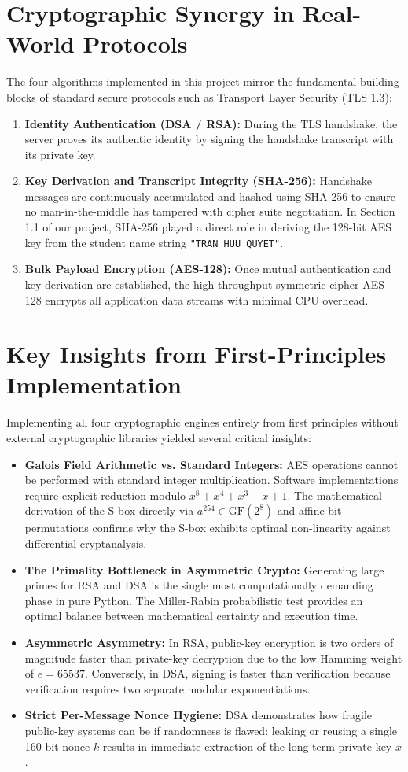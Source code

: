 \section{Cryptographic Synergy in Real-World Protocols}
The four algorithms implemented in this project mirror the fundamental building blocks of standard secure protocols such as Transport Layer Security (TLS 1.3):
\begin{enumerate}
    \item \textbf{Identity Authentication (DSA / RSA):} During the TLS handshake, the server proves its authentic identity by signing the handshake transcript with its private key.
    \item \textbf{Key Derivation and Transcript Integrity (SHA-256):} Handshake messages are continuously accumulated and hashed using SHA-256 to ensure no man-in-the-middle has tampered with cipher suite negotiation. In Section 1.1 of our project, SHA-256 played a direct role in deriving the 128-bit AES key from the student name string \texttt{"TRAN HUU QUYET"}.
    \item \textbf{Bulk Payload Encryption (AES-128):} Once mutual authentication and key derivation are established, the high-throughput symmetric cipher AES-128 encrypts all application data streams with minimal CPU overhead.
\end{enumerate}

\section{Key Insights from First-Principles Implementation}
Implementing all four cryptographic engines entirely from first principles without external cryptographic libraries yielded several critical insights:
\begin{itemize}
    \item \textbf{Galois Field Arithmetic vs. Standard Integers:} AES operations cannot be performed with standard integer multiplication. Software implementations require explicit reduction modulo $x^8 + x^4 + x^3 + x + 1$. The mathematical derivation of the S-box directly via $a^{254} \in \text{GF}(2^8)$ and affine bit-permutations confirms why the S-box exhibits optimal non-linearity against differential cryptanalysis.
    \item \textbf{The Primality Bottleneck in Asymmetric Crypto:} Generating large primes for RSA and DSA is the single most computationally demanding phase in pure Python. The Miller-Rabin probabilistic test provides an optimal balance between mathematical certainty and execution time.
    \item \textbf{Asymmetric Asymmetry:} In RSA, public-key encryption is two orders of magnitude faster than private-key decryption due to the low Hamming weight of $e = 65537$. Conversely, in DSA, signing is faster than verification because verification requires two separate modular exponentiations.
    \item \textbf{Strict Per-Message Nonce Hygiene:} DSA demonstrates how fragile public-key systems can be if randomness is flawed: leaking or reusing a single 160-bit nonce $k$ results in immediate extraction of the long-term private key $x$.
\end{itemize}

